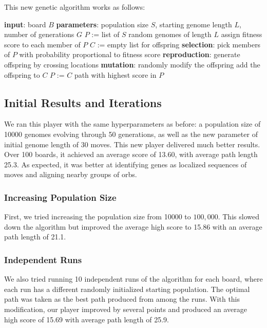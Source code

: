\documentclass[journal,final,letterpaper,11pt]{IEEEtran}
\begin{document}
This new genetic algorithm works as follows:

\begin{algorithmic}[1]
\STATE \textbf{input}: board $B$
\STATE \textbf{parameters}: population size $S$, starting genome length $L$, number of generations $G$
\STATE $P$ := list of $S$ random genomes of length $L$
  \STATE assign fitness score to each member of $P$
  \STATE $C$ := empty list for offspring
    \STATE \textbf{selection}: pick members of $P$ with probability proportional to fitness score
    \STATE \textbf{reproduction}: generate offspring by crossing locations
    \STATE \textbf{mutation}: randomly modify the offspring
    \STATE add the offspring to $C$
  \ENDFOR
  \STATE $P$ := $C$
\ENDFOR
\RETURN path with highest score in $P$
\end{algorithmic}

\subsection{Initial Results and Iterations}
We ran this player with the same hyperparameters as before: a population size of 10000 genomes evolving through 50 generations, as well as the new parameter of initial genome length of 30 moves. This new player delivered much better results. Over 100 boards, it achieved an average score of 13.60, with average path length 25.3. As expected, it was better at identifying genes as localized sequences of moves and aligning nearby groups of orbs.

\subsubsection{Increasing Population Size}
First, we tried increasing the population size from 10000 to $100,000$. This slowed down the algorithm but improved the average high score to 15.86 with an average path length of 21.1.

\subsubsection{Independent Runs}
We also tried running 10 independent runs of the algorithm for each board, where each run has a different randomly initialized starting population. The optimal path was taken as the best path produced from among the runs. With this modification, our player improved by several points and produced an average high score of 15.69 with average path length of 25.9.
\end{document}
